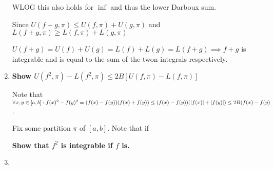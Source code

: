 \documentclass[10pt,a4paper]{article}
\DeclarePairedDelimiter{\abs}{\lvert}{\rvert}
\begin{document}
\begin{enumerate}
        WLOG this also holds for $\inf$ and thus the lower Darboux sum. 

        Since $U(f+g, \pi) \leq U(f, \pi) + U(g, \pi)$ and $L(f+g, \pi) \geq L(f, \pi) + L(g, \pi)$ 

        $U(f+g) = U(f) + U(g)  = L(f) + L(g) = L(f+g) \implies f+g$  is integrable and is equal to the sum of the twon integrals respectively.


    \item \textbf{Show $U(f^2, \pi) -L(f^2, \pi) \leq 2B[U(f, \pi) - L(f, \pi)]$}

        Note that $\forall x,y \in [a,b]: f(x)^2 - f(y)^2 = (f(x) -f(y))(f(x) + f(y)) \leq (f(x) -f(y))(\abs{f(x)} + \abs{f(y)}) \leq 2B(f(x) - f(y)$. 

        Fix some partition $\pi$ of $[a,b]$. Note that if

        \textbf{Show that $f^2$ is integrable if $f$ is.}

        
    \item 

\end{enumerate}
\end{document}
